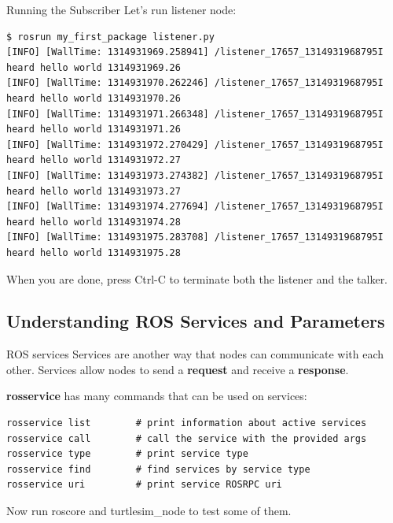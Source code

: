 \begin{frame}[fragile]{Running the Subscriber}
Let's run listener node:
\begin{lstlisting}[language=shell]
$ rosrun my_first_package listener.py 
[INFO] [WallTime: 1314931969.258941] /listener_17657_1314931968795I heard hello world 1314931969.26
[INFO] [WallTime: 1314931970.262246] /listener_17657_1314931968795I heard hello world 1314931970.26
[INFO] [WallTime: 1314931971.266348] /listener_17657_1314931968795I heard hello world 1314931971.26
[INFO] [WallTime: 1314931972.270429] /listener_17657_1314931968795I heard hello world 1314931972.27
[INFO] [WallTime: 1314931973.274382] /listener_17657_1314931968795I heard hello world 1314931973.27
[INFO] [WallTime: 1314931974.277694] /listener_17657_1314931968795I heard hello world 1314931974.28
[INFO] [WallTime: 1314931975.283708] /listener_17657_1314931968795I heard hello world 1314931975.28
\end{lstlisting}
When you are done, press Ctrl-C to terminate both the listener and the talker.
\end{frame}

\subsection{Understanding ROS Services and Parameters}

\begin{frame}[fragile]{ROS services}
Services are another way that nodes can communicate with each other. Services allow nodes to send a \textbf{request} and receive a \textbf{response}.

\vspace{.1cm}
\textbf{rosservice}  has many commands that can be used on services:

\begin{lstlisting}[language=syntax]
rosservice list        # print information about active services
rosservice call        # call the service with the provided args
rosservice type        # print service type
rosservice find        # find services by service type
rosservice uri         # print service ROSRPC uri
\end{lstlisting}

  Now run roscore and turtlesim\_node to test some of them.
\end{frame}

